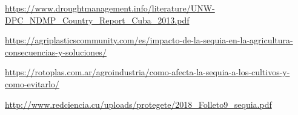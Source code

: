 \documentclass[12pt]{article}
\begin{document}
	
	\newpage
	\begin{thebibliography}{8}
		\url{https://www.droughtmanagement.info/literature/UNW-DPC_NDMP_Country_Report_Cuba_2013.pdf}
		
		\url{https://agriplasticscommunity.com/es/impacto-de-la-sequia-en-la-agricultura-consecuencias-y-soluciones/}
		
		\url{https://rotoplas.com.ar/agroindustria/como-afecta-la-sequia-a-los-cultivos-y-como-evitarlo/}
		
		\url{http://www.redciencia.cu/uploads/protegete/2018_Folleto9_sequia.pdf}
		
	\end{thebibliography}
	
	
\end{document}
